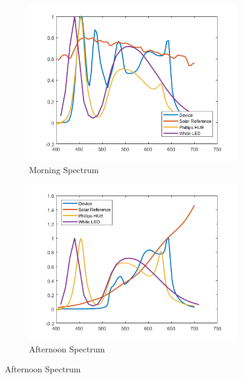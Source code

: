 \begin{figure}[hbt]
\centering
\begin{subfigure}[h]{0.4\textwidth}
	\includegraphics[width=\textwidth]{Images/Spectra/Morning.png}
	\caption{Morning Spectrum}
\end{subfigure}
\begin{subfigure}[h]{0.4\textwidth}
	\includegraphics[width=\textwidth]{Images/Spectra/Afternoon.png}
	\caption{Afternoon Spectrum}
\end{subfigure}


\end{figure}
